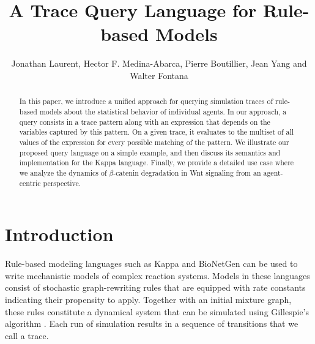 \documentclass[runningheads]{llncs}
\begin{document}
\title{A Trace Query Language for Rule-based Models}

\author{Jonathan Laurent, Hector F. Medina-Abarca,
Pierre Boutillier,
Jean Yang and Walter Fontana}




\maketitle


\begin{abstract}
  In this paper, we introduce a unified approach for querying
  simulation traces of rule-based models about the statistical
  behavior of individual agents. In our approach, a query consists in
  a trace pattern along with an expression that depends on the
  variables captured by this pattern. On a given trace, it evaluates
  to the multiset of all values of the expression for every possible
  matching of the pattern. We illustrate our proposed query language
  on a simple example, and then discuss its semantics and
  implementation for the Kappa language. Finally, we provide a
  detailed use case where we analyze the dynamics of $\beta$-catenin
  degradation in Wnt signaling from an agent-centric perspective.

\end{abstract}


\section{Introduction}

Rule-based modeling languages such as Kappa \cite{DanosEtAl-CONCUR07}
and BioNetGen \cite{bngl} can be used to write mechanistic models of
complex reaction systems. Models in these languages consist of
stochastic graph-rewriting rules that are equipped with rate constants
indicating their propensity to apply. Together with an initial mixture
graph, these rules constitute a dynamical system that can be simulated
using Gillespie's algorithm
\cite{gillespie1977exact,DanosEtAl-APLAS07,BoutillierEK17}. Each run
of simulation results in a sequence of transitions that we call a
trace.
\end{document}
